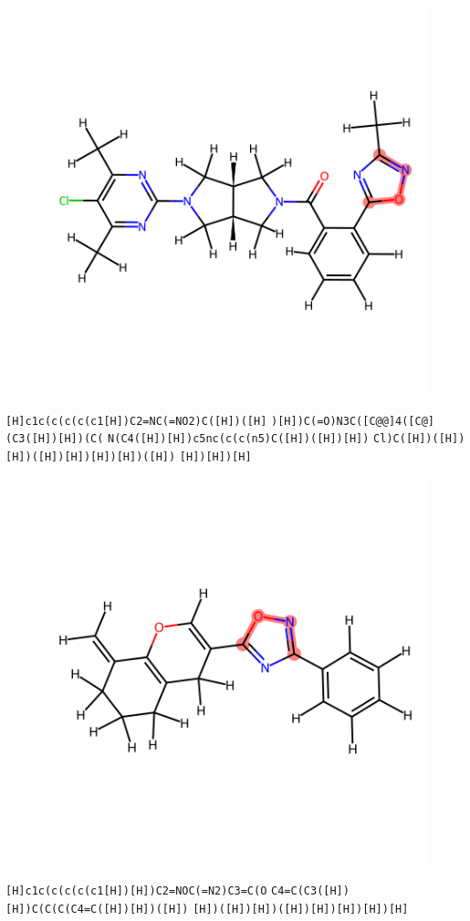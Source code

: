 \documentclass{article}
\begin{document}
\begin{figure}[ht]
\centering
    \includegraphics{mol120.png}
\end{figure}
\verb|[H]c1c(c(c(c(c1[H])C2=NC(=NO2)C([H])([H]| \verb|)[H])C(=O)N3C([C@@]4([C@](C3([H])[H])(C(| \verb|N(C4([H])[H])c5nc(c(c(n5)C([H])([H])[H])| \verb|Cl)C([H])([H])[H])([H])[H])[H])[H])([H])| \verb|[H])[H])[H]|

\begin{figure}[ht]
\centering
    \includegraphics{mol121.png}
\end{figure}
\verb|[H]c1c(c(c(c(c1[H])[H])C2=NOC(=N2)C3=C(O| \verb|C4=C(C3([H])[H])C(C(C(C4=C([H])[H])([H])| \verb|[H])([H])[H])([H])[H])[H])[H])[H]|
\end{document}
